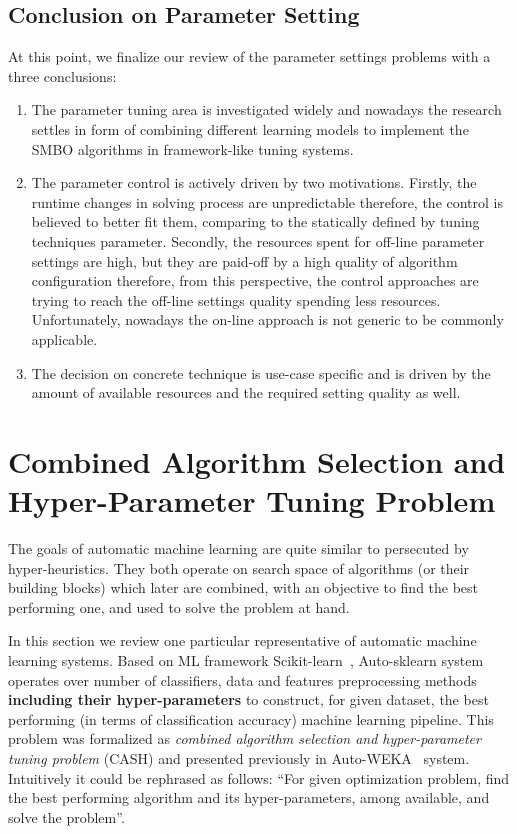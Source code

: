 \subsection{Conclusion on Parameter Setting}\label{bg: parameter setting conclution}
At this point, we finalize our review of the parameter settings problems with a three conclusions:
\begin{enumerate}
	\item The parameter tuning area is investigated widely and nowadays the research settles in form of combining different learning models to implement the SMBO algorithms in framework-like tuning systems.
	
	\item The parameter control is actively driven by two motivations. Firstly, the runtime changes in solving process are unpredictable therefore, the control is believed to better fit them, comparing to the statically defined by tuning techniques parameter. Secondly, the resources spent for off-line parameter settings are high, but they are paid-off by a high quality of algorithm configuration therefore, from this perspective, the control approaches are trying to reach the off-line settings quality spending less resources. Unfortunately, nowadays the on-line approach is not generic to be commonly applicable.
	
	\item The decision on concrete technique is use-case specific and is driven by the amount of available resources and the required setting quality as well.
\end{enumerate}

\section{Combined Algorithm Selection and Hyper-Parameter Tuning Problem}\label{bg: section cash}
The goals of automatic machine learning are quite similar to persecuted by hyper-heuristics. They both operate on search space of algorithms (or their building blocks) which later are combined, with an objective to find the best performing one, and used to solve the problem at hand. 

In this section we review one particular representative of automatic machine learning systems.
Based on ML framework Scikit-learn~\cite{scikit-learn}, Auto-sklearn system~\cite{feurer2015efficient} operates over number of classifiers, data and features preprocessing methods \textbf{including their hyper-parameters} to construct, for given dataset, the best performing (in terms of classification accuracy) machine learning pipeline.
This problem was formalized as \textit{combined algorithm selection and hyper-parameter tuning problem} (CASH) and presented previously in Auto-WEKA~\cite{thornton2013auto} system. Intuitively it could be rephrased as follows: ``For given optimization problem, find the best performing algorithm and its hyper-parameters, among available, and solve the problem''. 


